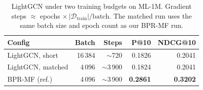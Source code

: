 \begin{table}[t]
\centering
\caption{LightGCN under two training budgets on ML-1M. Gradient steps $\approx$ epochs $\times\, |\mathcal{D}_{\text{train}}|/\text{batch}$. The matched run uses the same batch size and epoch count as our BPR-MF run.}
\label{tab:lgcnmatch}
\footnotesize
\setlength{\tabcolsep}{4pt}
\begin{tabular}{lrrrr}
\toprule
Config & Batch & Steps & P@10 & NDCG@10 \\
\midrule
LightGCN, short   & 16\,384 & $\sim$720  & 0.1826 & 0.2041 \\
LightGCN, matched & 4\,096 & $\sim$3\,900 & 0.1824 & 0.2041 \\
\midrule
BPR-MF (ref.)     & 4\,096 & $\sim$3\,900 & \textbf{0.2861} & \textbf{0.3202} \\
\bottomrule
\end{tabular}
\end{table}
